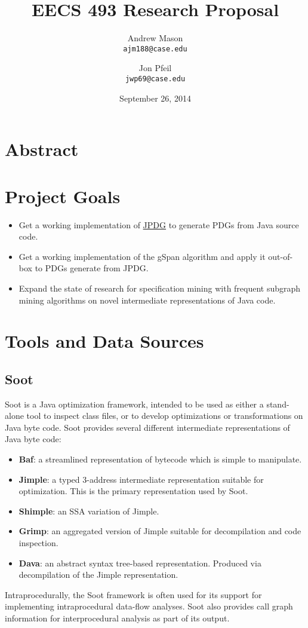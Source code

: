\documentclass[12pt]{article}
\title{EECS 493 Research Proposal}
\author{
    Andrew Mason\\
    \texttt{ajm188@case.edu}
    \and
    Jon Pfeil\\
    \texttt{jwp69@case.edu}
}
\date{September 26, 2014}
\begin{document}
\maketitle
\tableofcontents
\pagebreak
\section{Abstract}
\section{Project Goals}
\begin{itemize}
    \item Get a working implementation of \hyperref[subsection:JPDG]{JPDG} to generate PDGs from Java source code.
    \item Get a working implementation of the gSpan algorithm and apply it out-of-box to PDGs generate from JPDG.
    \item Expand the state of research for specification mining with frequent subgraph mining algorithms on novel intermediate representations of Java code.
\end{itemize}
\section{Tools and Data Sources}
\subsection{Soot}
Soot is a Java optimization framework, intended to be used as either a stand-alone tool to inspect class files, or to develop optimizations or transformations on Java byte code. Soot provides several different intermediate representations of Java byte code:
\begin{itemize}
    \item\textbf{Baf}: a streamlined representation of bytecode which is simple to manipulate.
    \item\textbf{Jimple}: a typed 3-address intermediate representation suitable for optimization. This is the primary representation used by Soot.
    \item\textbf{Shimple}: an SSA variation of Jimple.
    \item\textbf{Grimp}: an aggregated version of Jimple suitable for decompilation and code inspection.
    \item\textbf{Dava}: an abstract syntax tree-based representation. Produced via decompilation of the Jimple representation.
\end{itemize}
Intraprocedurally, the Soot framework is often used for its support for implementing intraprocedural data-flow analyses. Soot also provides call graph information for interprocedural analysis as part of its output.
\end{document}
